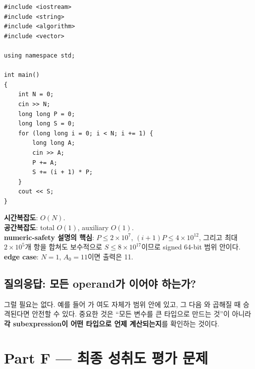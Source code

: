 \begin{answerbox}[학습자 제출 답안]
\begin{lstlisting}
#include <iostream>
#include <string>
#include <algorithm>
#include <vector>

using namespace std;

int main()
{
    int N = 0;
    cin >> N;
    long long P = 0;
    long long S = 0;
    for (long long i = 0; i < N; i += 1) {
        long long A;
        cin >> A;
        P += A;
        S += (i + 1) * P;
    }
    cout << S;
}
\end{lstlisting}

\textbf{시간복잡도}: $O(N)$.\\
\textbf{공간복잡도}: total $O(1)$, auxiliary $O(1)$.\\
\textbf{numeric-safety 설명의 핵심}: $P\le2\times10^7$, $(i+1)P\le4\times10^{12}$, 그리고 최대 $2\times10^5$개 항을 합쳐도 보수적으로 $S\le8\times10^{17}$이므로 signed 64-bit 범위 안이다.\\
\textbf{edge case}: $N=1$, $A_0=11$이면 출력은 11.
\end{answerbox}

\subsection{질의응답: 모든 operand가 이어야 하는가?}
그럴 필요는 없다. 예를 들어 가 여도  자체가  범위 안에 있고, 그 다음 와 곱해질 때 승격된다면 안전할 수 있다. 중요한 것은 ``모든 변수를 큰 타입으로 만드는 것''이 아니라 \textbf{각 subexpression이 어떤 타입으로 언제 계산되는지}를 확인하는 것이다.

\section{Part F --- 최종 성취도 평가 문제}

